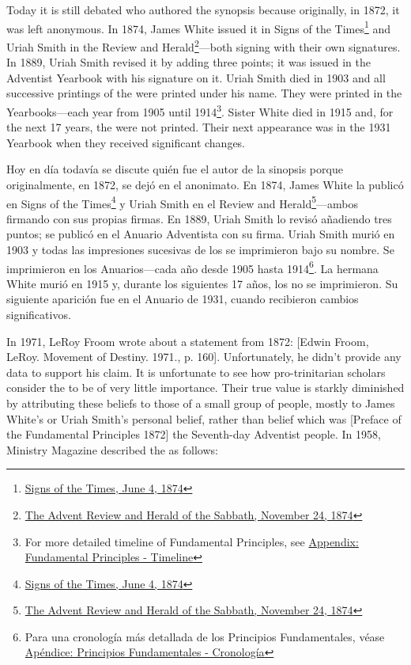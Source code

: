 Today it is still debated who authored the synopsis because originally, in 1872, it was left anonymous. In 1874, James White issued it in Signs of the Times\footnote{\href{https://adventistdigitallibrary.org/adl-364148/signs-times-june-4-1874}{Signs of the Times, June 4, 1874}} and Uriah Smith in the Review and Herald\footnote{\href{http://documents.adventistarchives.org/Periodicals/RH/RH18741124-V44-22.pdf}{The Advent Review and Herald of the Sabbath, November 24, 1874}}—both signing with their own signatures. In 1889, Uriah Smith revised it by adding three points; it was issued in the Adventist Yearbook with his signature on it. Uriah Smith died in 1903 and all successive printings of the  were printed under his name. They were printed in the Yearbooks—each year from 1905 until 1914\footnote{For more detailed timeline of Fundamental Principles, see \hyperref[appendix:timeline]{Appendix: Fundamental Principles - Timeline}}. Sister White died in 1915 and, for the next 17 years, the  were not printed. Their next appearance was in the 1931 Yearbook when they received significant changes.


Hoy en día todavía se discute quién fue el autor de la sinopsis porque originalmente, en 1872, se dejó en el anonimato. En 1874, James White la publicó en Signs of the Times\footnote{\href{https://adventistdigitallibrary.org/adl-364148/signs-times-june-4-1874}{Signs of the Times, June 4, 1874}} y Uriah Smith en el Review and Herald\footnote{\href{http://documents.adventistarchives.org/Periodicals/RH/RH18741124-V44-22.pdf}{The Advent Review and Herald of the Sabbath, November 24, 1874}}—ambos firmando con sus propias firmas. En 1889, Uriah Smith lo revisó añadiendo tres puntos; se publicó en el Anuario Adventista con su firma. Uriah Smith murió en 1903 y todas las impresiones sucesivas de los  se imprimieron bajo su nombre. Se imprimieron en los Anuarios—cada año desde 1905 hasta 1914\footnote{Para una cronología más detallada de los Principios Fundamentales, véase \hyperref[appendix:timeline]{Apéndice: Principios Fundamentales - Cronología}}. La hermana White murió en 1915 y, durante los siguientes 17 años, los  no se imprimieron. Su siguiente aparición fue en el Anuario de 1931, cuando recibieron cambios significativos.


In 1971, LeRoy Froom wrote about a statement from 1872: [Edwin Froom, LeRoy. Movement of Destiny. 1971., p. 160]. Unfortunately, he didn’t provide any data to support his claim. It is unfortunate to see how pro-trinitarian scholars consider the  to be of very little importance. Their true value is starkly diminished by attributing these beliefs to those of a small group of people, mostly to James White’s or Uriah Smith’s personal belief, rather than belief which was [Preface of the Fundamental Principles 1872] the Seventh-day Adventist people. In 1958, Ministry Magazine described the  as follows:


